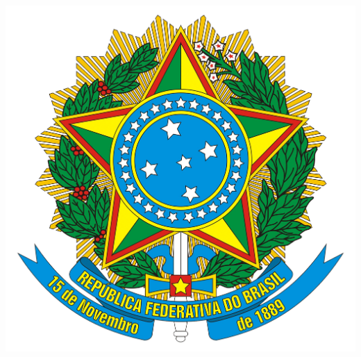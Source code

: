 \begin{center}
\includegraphics[scale=0.04]{brasao.png} \\
{\bf \small \NomeSecretaria}
\end{center}

\restoregeometry
\newpage
